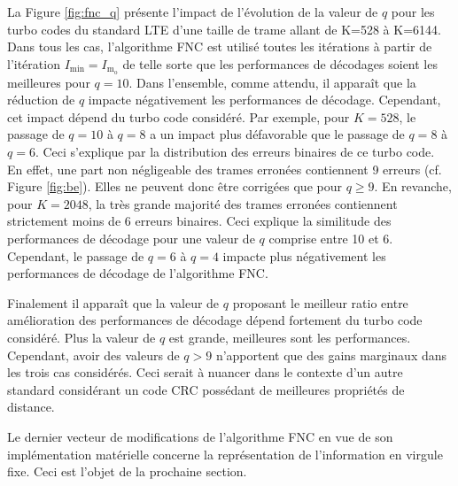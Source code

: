 La Figure \ref{fig:fnc_q} présente l'impact de l'évolution de la valeur de $q$ pour les turbo codes du standard LTE 
d'une taille de trame allant de K=528 à K=6144. Dans tous les cas, l'algorithme FNC est utilisé toutes les itérations à 
partir de l'itération $I_\text{min} = I_{\text{m}_\text{o}}$ de telle sorte que les performances de décodages 
soient les meilleures pour $q=10$. Dans l'ensemble, comme attendu, il apparaît que la réduction de $q$ impacte 
négativement les performances de décodage. Cependant, cet impact dépend du turbo code considéré. Par exemple, pour 
$K=528$, le passage de $q=10$ à $q=8$ a un impact plus défavorable que le passage de $q=8$ à $q=6$. Ceci s'explique par
la distribution des erreurs binaires de ce turbo code. En effet, une part non négligeable des trames erronées contiennent
9 erreurs (cf. Figure \ref{fig:be}). Elles ne peuvent donc être corrigées que pour $q\geq 9$. En 
revanche, pour $K=2048$, la très grande majorité des trames erronées contiennent strictement moins de 6 erreurs binaires.
Ceci explique la similitude des performances de décodage pour une valeur de $q$ comprise entre 10 et 6. Cependant, le 
passage de $q=6$ à $q=4$ impacte plus négativement les performances de décodage de l'algorithme FNC.

Finalement il apparaît que la valeur de $q$ proposant le meilleur ratio entre amélioration des performances de décodage 
dépend fortement du turbo code considéré. Plus la valeur de $q$ est grande, meilleures sont les performances. Cependant,
avoir des valeurs de $q>9$ n'apportent que des gains marginaux dans les trois cas considérés. Ceci serait à nuancer dans le contexte 
d'un autre standard considérant un code CRC possédant de meilleures propriétés de distance.

Le dernier vecteur de modifications de l'algorithme FNC en vue de son implémentation matérielle concerne la représentation de 
l'information en virgule fixe. Ceci est l'objet de la prochaine section.

